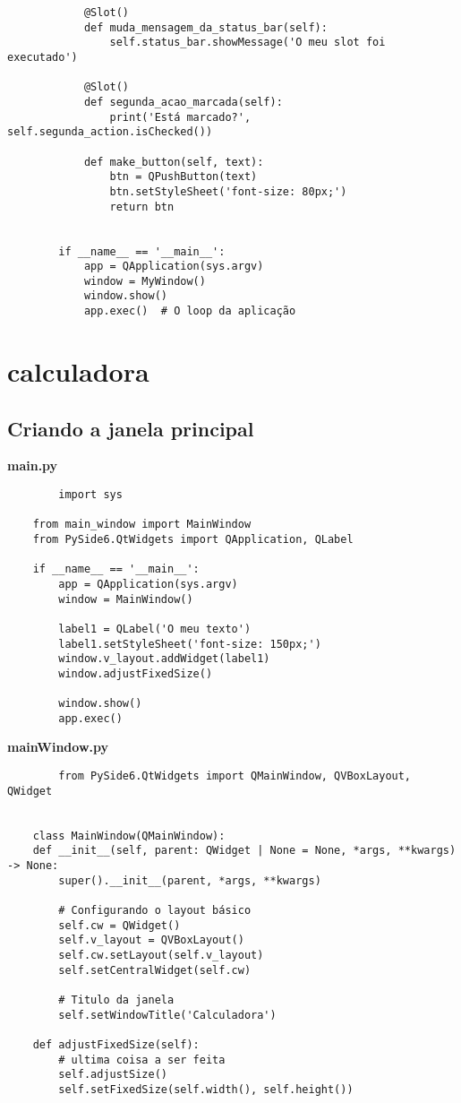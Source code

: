 \documentclass[12pt,a4paper]{article}
\begin{document}
\begin{lstlisting}
            @Slot()
            def muda_mensagem_da_status_bar(self):
                self.status_bar.showMessage('O meu slot foi executado')
        
            @Slot()
            def segunda_acao_marcada(self):
                print('Está marcado?', self.segunda_action.isChecked())
        
            def make_button(self, text):
                btn = QPushButton(text)
                btn.setStyleSheet('font-size: 80px;')
                return btn
        
        
        if __name__ == '__main__':
            app = QApplication(sys.argv)
            window = MyWindow()
            window.show()
            app.exec()  # O loop da aplicação
    \end{lstlisting}
    \section{calculadora}
    \subsection{Criando a janela principal }
    \textbf{main.py}
    \begin{lstlisting}
        import sys

    from main_window import MainWindow
    from PySide6.QtWidgets import QApplication, QLabel

    if __name__ == '__main__':
        app = QApplication(sys.argv)
        window = MainWindow()

        label1 = QLabel('O meu texto')
        label1.setStyleSheet('font-size: 150px;')
        window.v_layout.addWidget(label1)
        window.adjustFixedSize()

        window.show()
        app.exec()
    \end{lstlisting}
    \textbf{mainWindow.py}
    \begin{lstlisting}
        from PySide6.QtWidgets import QMainWindow, QVBoxLayout, QWidget


    class MainWindow(QMainWindow):
    def __init__(self, parent: QWidget | None = None, *args, **kwargs) -> None:
        super().__init__(parent, *args, **kwargs)

        # Configurando o layout básico
        self.cw = QWidget()
        self.v_layout = QVBoxLayout()
        self.cw.setLayout(self.v_layout)
        self.setCentralWidget(self.cw)

        # Titulo da janela
        self.setWindowTitle('Calculadora')

    def adjustFixedSize(self):
        # ultima coisa a ser feita
        self.adjustSize()
        self.setFixedSize(self.width(), self.height())
    \end{lstlisting}
\end{document}
